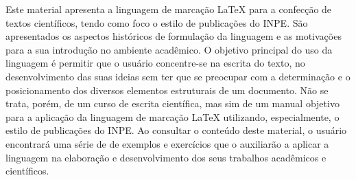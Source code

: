 \begin{resumo}

\hypertarget{estilo:resumo}{} 

Este material apresenta a linguagem de marcação \LaTeX{} para a confecção de textos científicos, tendo como foco o estilo de publicações do INPE. São apresentados os aspectos históricos de formulação da linguagem e as motivações para a sua introdução no ambiente acadêmico. O objetivo principal do uso da linguagem é permitir que o usuário concentre-se na escrita do texto, no desenvolvimento das suas ideias sem ter que se preocupar com a determinação e o posicionamento dos diversos elementos estruturais de um documento. Não se trata, porém, de um curso de escrita científica, mas sim de um manual objetivo para a aplicação da linguagem de marcação \LaTeX{} utilizando, especialmente, o estilo de publicações do INPE. Ao consultar o conteúdo deste material, o usuário encontrará uma série de de exemplos e exercícios que o auxiliarão a aplicar a linguagem na elaboração e desenvolvimento dos seus trabalhos acadêmicos e científicos.

 
\end{resumo}
